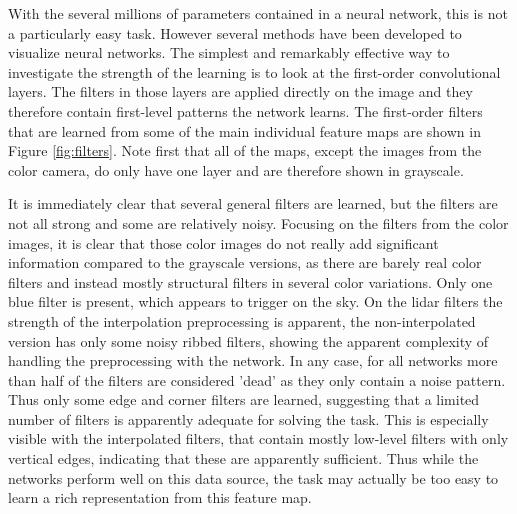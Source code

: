 With the several millions of parameters contained in a neural network, this is not a particularly easy task. However several methods have been developed to visualize neural networks. The simplest and remarkably effective way to investigate the strength of the learning is to look at the first-order convolutional layers. The filters in those layers are applied directly on the image and they therefore contain first-level patterns the network learns. The first-order filters that are learned from some of the main individual feature maps are shown in Figure \ref{fig:filters}. Note first that all of the maps, except the images from the color camera, do only have one layer and are therefore shown in grayscale. 

It is immediately clear that several general filters are learned, but the filters are not all strong and some are relatively noisy. Focusing on the filters from the color images, it is clear that those color images do not really add significant information compared to the grayscale versions, as there are barely real color filters and instead mostly structural filters in several color variations. Only one blue filter is present, which appears to trigger on the sky. On the lidar filters the strength of the interpolation preprocessing is apparent, the non-interpolated version has only some noisy ribbed filters, showing the apparent complexity of handling the preprocessing with the network. In any case, for all networks more than half of the filters are considered 'dead' as they only contain a noise pattern. Thus only some edge and corner filters are learned, suggesting that a limited number of filters is apparently adequate for solving the task. This is especially visible with the interpolated filters, that contain mostly low-level filters with only vertical edges, indicating that these are apparently sufficient. Thus while the networks perform well on this data source, the task may actually be too easy to learn a rich representation from this feature map.

